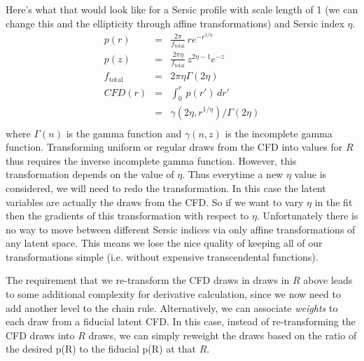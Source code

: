 \documentclass[modern]{aastex6}
\begin{document}
Here's what that would look like for a Sersic profile with scale length of 1 (we can change this and the ellipticity through affine transformations) and Sersic index $\eta$.
\begin{eqnarray}
 p(r) & = & \frac{2\pi}{f_{\mbox{total}}} \, r e^{-r^{1/\eta}} \nonumber \\
 p(z)  & = & \frac{2\pi \eta }{f_{\mbox{total}}} \, z^{2\eta - 1} e^{-z} \nonumber \\
f_{\mbox{total}} & = & 2\pi\eta \Gamma(2\eta) \nonumber \\ 
CFD(r) & = & \int_0^r \, p(r') \, dr'  \nonumber \\
   & = & \gamma(2\eta, r^{1/\eta}) / \Gamma(2\eta) \\
\end{eqnarray}
where $\Gamma(n)$ is the gamma function and $\gamma(n, z)$ is the incomplete gamma function.
Transforming uniform or regular draws from the CFD into values for $R$ thus requires the inverse incomplete gamma function.
However, this transformation depends on the value of $\eta$.
Thus everytime a new $\eta$ value is considered, we will need to redo the transformation.
In this case the latent variables are actually the draws from the CFD.
So if we want to vary $\eta$ in the fit then the gradients of this transformation with respect to $\eta$.
Unfortunately there is no way to move between different Sersic indices via only affine transformations of any latent space.
This means we lose the nice quality of keeping all of our transformations simple (i.e. without expensive transcendental functions).

The requirement that we re-transform the CFD draws in draws in $R$ above leads to some additional complexity for derivative calculation, 
since we now need to add another level to the chain rule.
Alternatively, we can associate \emph{weights} to each draw from a fiducial latent CFD.
In this case, instead of re-transforming the CFD draws into $R$ draws, 
we can simply reweight the draws based on the ratio of the desired p(R) to the fiducial p(R) at that $R$.
\end{document}
